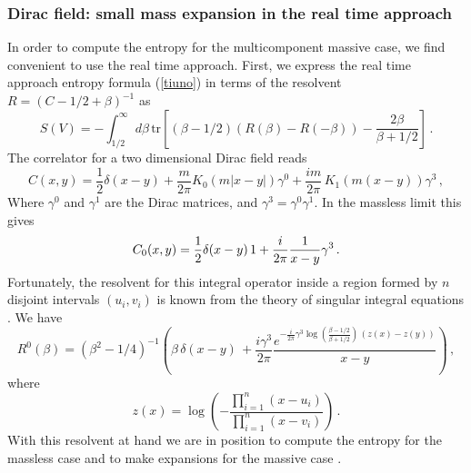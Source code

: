 \documentclass[a4paper]{article}
\begin{document}
\subsubsection{Dirac field: small mass expansion in the real time approach}

In order to compute the entropy for the multicomponent massive case, we find convenient to use the real time approach. 
First, we express the real time approach entropy formula (\ref{tiuno}) in terms of the resolvent $R=(C-1/2+\beta)^{-1}$ as
\begin{equation}
S(V)=-\int^\infty_{1/2} d\beta\, \textrm{tr}\left[\left(\beta-1/2\right) \left(R(\beta)-R(-\beta)\right)-\frac{2\beta}{\beta+1/2}\right]\,.\label{fas}
\end{equation}  
The correlator for a two dimensional Dirac field reads 
\begin{equation}
C(x,y)=\frac{1}{2} \delta(x-y) +\frac{m}{2\pi} K_0(m|x-y|) \gamma^0  +\frac{i m}{2 \pi} \, K_1(m (x-y)) \gamma^3  \,,\label{crosta}
\end{equation}
Where $\gamma^0$ and $\gamma^1$ are the Dirac matrices, and $\gamma^3=\gamma^0 \gamma^1$. 
In the massless limit this gives 
\begin{equation}
C_0 (x,y)=\frac{1}{2} \delta(x-y)\, 
 1+ \frac{i}{2\pi}\frac{1}{x-y} \gamma^3\,. \label{hora}\\
\end{equation} 
Fortunately, the resolvent for this integral operator inside a region formed by $n$ disjoint intervals $(u_i,v_i)$ is known from the theory of singular integral equations  \cite{reso}. We have  
\begin{equation}       
R^0(\beta) =\left(\beta^2-1/4 \right)^{-1}
\left(\beta\,\delta(x-y)\, 
+\frac{i \gamma^3}{2\pi}   \frac{e^{-\frac{i}{2\pi}\gamma^3 \log\left(\frac{\beta-1/2}{\beta+1/2}\right)\, (z(x)-z(y)) }}{x-y}
\right)\,,\label{reso}
\end{equation}
where
\begin{equation}
z(x)=\log\left(-\frac{\prod_{i=1}^n (x-u_i)}{\prod_{i=1}^n (x-v_i)}\right) \,. \label{bfbf}
\end{equation}
With this resolvent at hand we are in position to compute the entropy for the massless case and to make expansions for the massive case \cite{futuro}.
\end{document}
